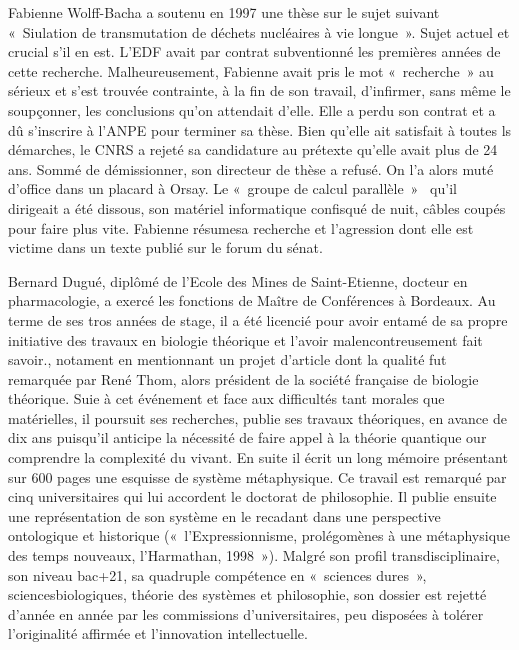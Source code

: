 \documentclass[a4paper,12pt]{article}
\begin{document}
Fabienne Wolff-Bacha a soutenu en 1997 une thèse sur le sujet suivant « Siulation de transmutation de déchets nucléaires à vie longue ». Sujet actuel et crucial s’il en est. L’EDF avait par contrat subventionné les premières années de cette recherche. Malheureusement, Fabienne avait pris le mot « recherche » au sérieux et s’est trouvée contrainte, à la fin de son travail, d’infirmer, sans même le soupçonner, les conclusions qu’on attendait d’elle. Elle a perdu son contrat et a dû s’inscrire à l’ANPE pour terminer sa thèse. Bien qu’elle ait satisfait à toutes ls démarches, le CNRS a rejeté sa candidature au prétexte qu’elle avait plus de 24 ans. Sommé de démissionner, son directeur de thèse a refusé. On l’a alors muté d’office dans un placard à Orsay. Le « groupe de calcul parallèle »  qu’il dirigeait a été dissous, son matériel informatique confisqué de nuit, câbles coupés pour faire plus vite. Fabienne résumesa recherche et l’agression dont elle est victime dans un texte publié sur le forum du sénat.

Bernard Dugué, diplômé de l’Ecole des Mines de Saint-Etienne, docteur en pharmacologie, a exercé les fonctions de Maître de Conférences à Bordeaux. Au terme de ses tros années de stage, il a été licencié pour avoir entamé de sa propre initiative des travaux en biologie théorique et l’avoir malencontreusement fait savoir., notament en mentionnant un projet d’article dont la qualité fut remarquée par René Thom, alors président de la société française de biologie théorique. Suie à cet événement et face aux difficultés tant morales que matérielles, il poursuit ses recherches, publie ses travaux théoriques, en avance de dix ans puisqu’il anticipe la nécessité de faire appel à la théorie quantique our comprendre la complexité du vivant. En suite il écrit un long mémoire présentant sur 600 pages une esquisse de système métaphysique. Ce travail est remarqué par cinq universitaires qui lui accordent le doctorat de philosophie. Il publie ensuite une représentation de son système en le recadant dans une perspective ontologique et historique (« l’Expressionnisme, prolégomènes à une métaphysique des temps nouveaux, l’Harmathan, 1998 »). Malgré son profil transdisciplinaire, son niveau bac+21, sa quadruple compétence en « sciences dures », sciencesbiologiques, théorie des systèmes et philosophie, son dossier est rejetté d’année en année par les commissions d’universitaires, peu disposées à tolérer l’originalité affirmée et l’innovation intellectuelle.
\end{document}
